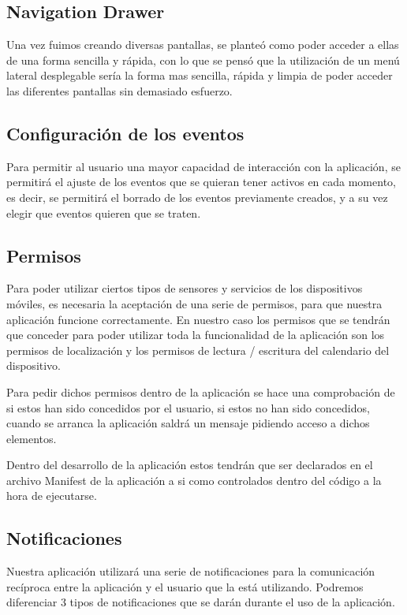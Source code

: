 \subsection{Navigation Drawer}
Una vez fuimos creando diversas pantallas, se planteó como poder acceder a ellas de una forma sencilla y rápida, con lo que se pensó que la utilización de un menú lateral desplegable sería la forma mas sencilla, rápida y limpia de poder acceder las diferentes pantallas sin demasiado esfuerzo.

\subsection{Configuración de los eventos}
Para permitir al usuario una mayor capacidad de interacción con la aplicación, se permitirá el ajuste de los eventos que se quieran tener activos en cada momento, es decir, se permitirá el borrado de los eventos previamente creados, y a su vez elegir que eventos quieren que se traten.

\subsection{Permisos}
Para poder utilizar ciertos tipos de sensores y servicios de los dispositivos móviles, es necesaria la aceptación de una serie de permisos, para que nuestra aplicación funcione correctamente. En nuestro caso los permisos que se tendrán que conceder para poder utilizar toda la funcionalidad de la aplicación son los permisos de localización y los permisos de lectura / escritura del calendario del dispositivo.

Para pedir dichos permisos dentro de la aplicación se hace una comprobación de si estos han sido concedidos por el usuario, si estos no han sido concedidos, cuando se arranca la aplicación saldrá un mensaje pidiendo acceso a dichos elementos.

Dentro del desarrollo de la aplicación estos tendrán que ser declarados en el archivo Manifest de la aplicación a si como controlados dentro del código a la hora de ejecutarse.\cite{permisos}

\subsection{Notificaciones}
Nuestra aplicación utilizará una serie de notificaciones para la comunicación recíproca entre la aplicación y el usuario que la está utilizando. Podremos diferenciar 3 tipos de notificaciones que se darán durante el uso de la aplicación.

